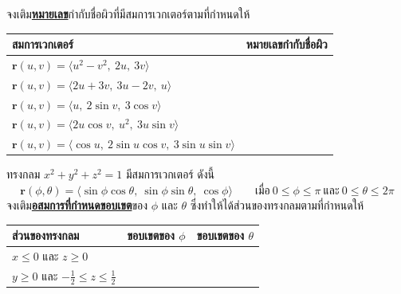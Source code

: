 \documentclass[12pt,final]{novelette} %
\begin{document}
\begin{question}
\begin{question}
        \bigskip
        จงเติม\uline{\bf หมายเลข}กำกับชื่อผิวที่มีสมการเวกเตอร์ตามที่กำหนดให้
        \begin{center}
            \renewcommand{\arraystretch}{1.6}
            \begin{tabular}{|C{8.2cm}|C{3.6cm}|}
                \hline
                \bf สมการเวกเตอร์                                                               & \bf หมายเลขกำกับชื่อผิว \\\hline\hline
                $\mathbf r(u, v) = \langle u^2 - v^2,\ 2u,\ 3v \rangle$                        &                    \\\hline
                $\mathbf r(u, v) = \langle 2u + 3v,\ 3u - 2v,\ u \rangle$                      &                    \\\hline
                $\mathbf r(u, v) = \langle u,\ 2 \sin v,\ 3 \cos v \rangle$                    &                    \\\hline
                $\mathbf r(u, v) = \langle 2 u \cos v,\ u^2,\ 3 u \sin v \rangle$              &                    \\\hline
                $\mathbf r(u, v) = \langle \cos u,\ 2 \sin u \cos v,\ 3 \sin u \sin v \rangle$ &                    \\\hline
            \end{tabular}
        \end{center}

        \enlargethispage{\baselineskip}
        \vspace{-.5\baselineskip}

        \item ทรงกลม $x^2 + y^2 + z^2 = 1$ มีสมการเวกเตอร์ ดังนี้
        \[
            \mathbf r(\phi, \theta) = \langle \sin \phi \cos \theta,\ \sin \phi \sin \theta,\ \cos \phi \rangle \qquad \text{เมื่อ}\ 0 \leq \phi \leq \pi\ \text{และ}\ 0 \leq \theta \leq 2 \pi
        \]
        จงเติม\uline{\bf อสมการที่กำหนดขอบเขต}ของ $\phi$ และ $\theta$ ซึ่งทำให้ได้ส่วนของทรงกลมตามที่กำหนดให้
        \begin{center}
            \renewcommand{\arraystretch}{1.6}
            \begin{tabular}{|C{4cm}|C{3.5cm}|C{3.5cm}|}
                \hline
                \bf ส่วนของทรงกลม                              & \bf ขอบเขตของ $\phi$ & \bf ขอบเขตของ $\theta$ \\\hline\hline
                $x \leq 0$ และ $z \geq 0$                     &                      &                        \\\hline
                $y \geq 0$ และ $-\frac12 \leq z \leq \frac12$ &                      &                        \\\hline
            \end{tabular}
        \end{center}
    \end{question}


\end{question}
\end{document}
